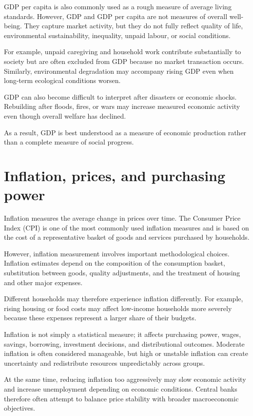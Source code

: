 \documentclass[
  11pt,
  oneside]{book}
\begin{document}
GDP per capita is also commonly used as a rough measure of average living standards. However, GDP and GDP per capita are not measures of overall well-being. They capture market activity, but they do not fully reflect quality of life, environmental sustainability, inequality, unpaid labour, or social conditions.

For example, unpaid caregiving and household work contribute substantially to society but are often excluded from GDP because no market transaction occurs. Similarly, environmental degradation may accompany rising GDP even when long-term ecological conditions worsen.

GDP can also become difficult to interpret after disasters or economic shocks. Rebuilding after floods, fires, or wars may increase measured economic activity even though overall welfare has declined.

As a result, GDP is best understood as a measure of economic production rather than a complete measure of social progress.

\section{Inflation, prices, and purchasing power}\label{inflation-prices-and-purchasing-power}

Inflation measures the average change in prices over time. The Consumer Price Index (CPI) is one of the most commonly used inflation measures and is based on the cost of a representative basket of goods and services purchased by households.

However, inflation measurement involves important methodological choices. Inflation estimates depend on the composition of the consumption basket, substitution between goods, quality adjustments, and the treatment of housing and other major expenses.

Different households may therefore experience inflation differently. For example, rising housing or food costs may affect low-income households more severely because these expenses represent a larger share of their budgets.

Inflation is not simply a statistical measure; it affects purchasing power, wages, savings, borrowing, investment decisions, and distributional outcomes. Moderate inflation is often considered manageable, but high or unstable inflation can create uncertainty and redistribute resources unpredictably across groups.

At the same time, reducing inflation too aggressively may slow economic activity and increase unemployment depending on economic conditions. Central banks therefore often attempt to balance price stability with broader macroeconomic objectives.
\end{document}
